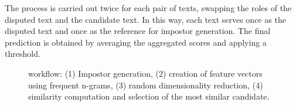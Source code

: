 The process is carried out twice for each pair of texts, swapping the roles of the disputed text and the candidate text. 
In this way, each text serves once as the disputed text and once as the reference for impostor generation. 
The final prediction is obtained by averaging the aggregated scores and applying a threshold.


\begin{figure}[htbp]
    \centering
    
    \caption{\impAppr{} workflow: (1) Impostor generation, (2) creation of feature vectors using frequent n-grams, (3) random dimensionality reduction, (4) similarity computation and selection of the most similar candidate.}
    \label{fig:impostor}
\end{figure}






%     


